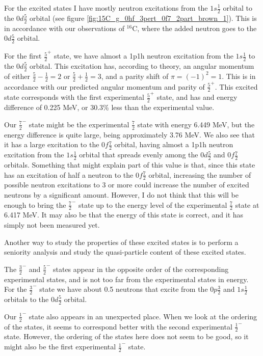 For the excited states I have mostly neutron excitations from the $1s\frac12$
orbital to the $0d\frac52$ orbital (see figure
\ref{fig:15C_g_0hf_3pert_0f7_2part_brown_1}). This is in  accordance with
our observations of $^{16}$C, where the added neutron goes to the $0d\frac52$
orbital.

For the first $\frac52^+$ state, we have almost a 1p1h neutron excitation from
the $1s\frac12$ to the $0d\frac52$ orbital.
This excitation has, according to
theory, an angular momentum of either $\frac52-\frac12 = 2$ or $\frac52+\frac12
= 3$, and a parity shift of $\pi = (-1)^2 = 1$. This is in accordance with our
predicted angular momentum and parity of $\frac52^+$.
This excited state corresponds with
the first experimental $\frac52^+$ state, and has and energy difference of
0.225 MeV, or 30.3\% less than the experimental value.

Our $\frac72^-$ state might be the experimental $\frac72$ state with energy
6.449 MeV, but the energy difference is quite large, being approximately 3.76
MeV. We also see that it has a large excitation to the $0f\frac72$ orbital,
having almost a 1p1h neutron excitation from the $1s\frac12$ orbital that
spreads evenly among the $0d\frac52$ and $0f\frac72$ orbitals. Something that
might explain part of this value is that, since this state has an excitation of
half a neutron to the $0f\frac72$ orbital, increasing the number of possible
neutron excitations to 3 or more could increase the number of excited neutrons
by a significant amount. However, I do not think that this will be enough to
bring the $\frac72^-$ state up to the energy level of the experimental
$\frac72$ state at 6.417 MeV. It may also be that the energy of this state is
correct, and it has simply not been measured yet.

Another way to study the properties of these excited states is to perform a seniority analysis and study 
the quasi-particle content  of these excited states. 


The $\frac32^-$ and $\frac52^-$ states appear in the opposite order of the
corresponding experimental states, and is not too far from the experimental
states in energy. For the $\frac32^-$ state we have about 0.5 neutrons that excite from the $0p\frac32$ and $1s\frac12$ orbitals to the $0d\frac52$ orbital.

Our $\frac12^-$ state also appears in an unexpected place. When we look at the
ordering of the states, it seems to correspond better with the second
experimental $\frac12^-$ state. However, the ordering of the states here does
not seem to be good, so it might also be the first experimental $\frac12^-$
state.

